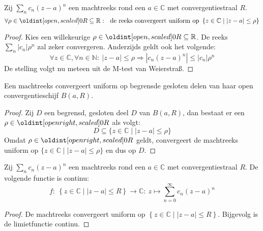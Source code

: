 \documentclass[main.tex]{subfiles}
\begin{document}
\begin{bst}
  \label{st:machtreeks-convergeert-uniform-op-open-convergentieschijf}
  Zij $\sum_{n}c_{n}(z-a)^{n}$ een machtreeks rond een $a\in \mathbb{C}$ met convergentiestraal $R$.
  \[ \forall \rho \in \interval[open]{0}{R} \subseteq \mathbb{R}:\ \text{ de reeks convergeert uniform op } \left\{ z \in \mathbb{C} \mid |z-a| \le \rho \right\} \]

  \begin{proof}
    Kies een willekeurige $\rho \in \interval[open]{0}{R} \subseteq \mathbb{R}$.
    De reeks $\sum_{n}|c_{n}|\rho^{n}$ zal zeker convergeren.
    Anderzijds geldt ook het volgende:
    \[ \forall z\in \mathbb{C}, \forall n\in \mathbb{N}:\ |z-a|\le \rho \Rightarrow |c_{n}(z-a)^{n}| \le |c_{n}|\rho^{n} \]
    De stelling volgt nu meteen uit de M-test van Weierstra\ss.
  \end{proof}
\end{bst}

\begin{gev}
  Een machtreeks convergeert uniform op begrensde gesloten delen van haar open convergentieschijf $B(a,R)$.
  \begin{proof}
    Zij $D$ een begrensd, gesloten deel $D$ van $B(a,R)$, dan bestaat er een $\rho \in \interval[open right]{0}{R}$ als volgt:
    \[ D \subseteq \{ z \in \mathbb{C} \mid |z-a| \le \rho \} \]
    Omdat $\rho \in \interval[open right]{0}{R}$ geldt, convergeert de machtreeks uniform op $\{ z \in \mathbb{C} \mid |z-a| \le \rho \}$ en dus op $D$.
  \end{proof}
\end{gev}

\begin{bgev}
  Zij $\sum_{n}c_{n}(z-a)^{n}$ een machtreeks rond een $a\in \mathbb{C}$ met convergentiestraal $R$.
  De volgende functie is continu:
  \[ f:\ \left\{ z \in \mathbb{C} \mid |z-a| \le R \right\} \rightarrow \mathbb{C}:\ z \mapsto \sum_{n=0}^{\infty}c_{n}(z-a)^{n}  \]

  \begin{proof}
    De machtreeks convergeert uniform op $\left\{ z \in \mathbb{C} \mid |z-a| \le R \right\}$.
    Bijgevolg is de limietfunctie continu.
  \end{proof}
\end{bgev}
\end{document}
